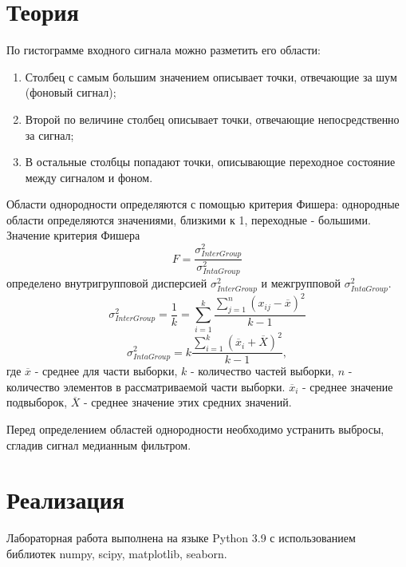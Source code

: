 \documentclass[a4paper,12pt]{article} %
\begin{document}
\section{Теория}
По гистограмме входного сигнала можно разметить его области:
\begin{enumerate}
    \item Столбец с самым большим значением описывает точки, отвечающие за шум (фоновый сигнал);
    \item Второй по величине столбец описывает точки, отвечающие непосредственно за сигнал;
    \item В остальные столбцы попадают точки, описывающие переходное состояние между сигналом и фоном.
\end{enumerate}
Области однородности определяются с помощью критерия Фишера: однородные области определяются значениями, близкими к 1, переходные - большими.
Значение критерия Фишера
$$F=\dfrac{\sigma^2_{InterGroup}}{\sigma^2_{IntaGroup}}$$
определено внутригрупповой дисперсией $\sigma^2_{InterGroup}$ и межгрупповой $\sigma^2_{IntaGroup}$.
$$\sigma^2_{InterGroup}=\dfrac{1}{k}=\sum\limits_{i=1}^k\dfrac{\sum_{j=1}^n(x_{ij}-\overline{x})^2}{k-1}$$
$$\sigma^2_{IntaGroup}=k\dfrac{\sum^k_{i=1}(\overline{x}_i+\overline{X})^2}{k-1},$$
где $\overline{x}$ - среднее для части выборки, $k$ - количество частей выборки, $n$ - количество элементов в рассматриваемой части выборки. $\overline{x}_i$ - среднее значение подвыборок, $\overline{X}$ - среднее значение этих средних значений.

Перед определением областей однородности необходимо устранить выбросы, сгладив сигнал медианным фильтром.
\section{Реализация}
Лабораторная работа выполнена на языке Python 3.9 с использованием библиотек numpy, scipy, matplotlib, seaborn.
\end{document}
